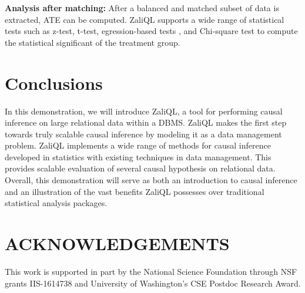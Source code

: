 {\bf Analysis after matching:} After a balanced and matched subset of data is extracted, ATE can be computed. ZaliQL supports a wide range of statistical tests such as z-test, t-test, egression-based tests , and Chi-square test to compute the statistical significant of the treatment group.


\section{Conclusions}
In this demonstration, we will introduce ZaliQL, a tool for performing causal inference on large relational data within a DBMS. ZaliQL makes the first step towards truly scalable causal inference by modeling it as a data management problem. ZaliQL implements a wide range of methods for causal inference developed in statistics with existing techniques in data management. This provides scalable evaluation of several causal hypothesis on relational data. Overall, this demonstration will serve as both an introduction to causal inference and an illustration of the vast benefits ZaliQL possesses over traditional statistical analysis packages.


\section{ACKNOWLEDGEMENTS}
This work is supported in part by the National Science Foundation through NSF grants IIS-1614738 and
University of Washington's CSE Postdoc Research Award.





